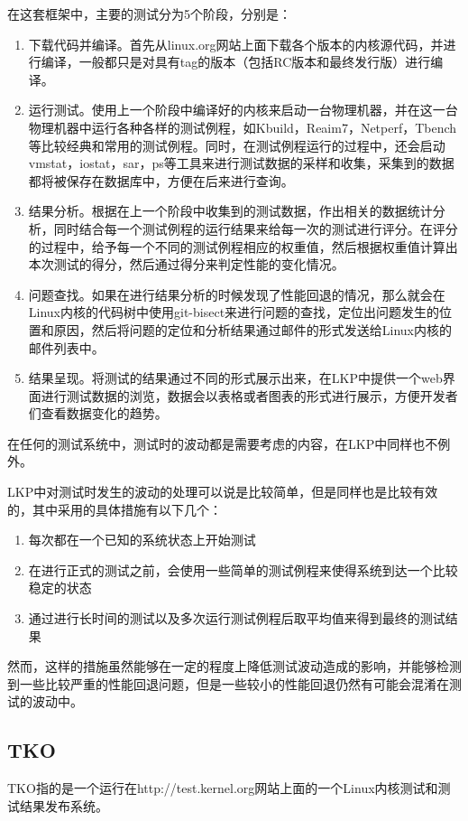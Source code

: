 在这套框架中，主要的测试分为5个阶段，分别是：
\begin{enumerate}
\item 下载代码并编译。首先从linux.org网站上面下载各个版本的内核源代码，并进行编译，一般都只是对具有tag的版本（包括RC版本和最终发行版）进行编译。
\item 运行测试。使用上一个阶段中编译好的内核来启动一台物理机器，并在这一台物理机器中运行各种各样的测试例程，如Kbuild，Reaim7，Netperf，Tbench等比较经典和常用的测试例程。同时，在测试例程运行的过程中，还会启动vmstat，iostat，sar，ps等工具来进行测试数据的采样和收集，采集到的数据都将被保存在数据库中，方便在后来进行查询。
\item 结果分析。根据在上一个阶段中收集到的测试数据，作出相关的数据统计分析，同时结合每一个测试例程的运行结果来给每一次的测试进行评分。在评分的过程中，给予每一个不同的测试例程相应的权重值，然后根据权重值计算出本次测试的得分，然后通过得分来判定性能的变化情况。
\item 问题查找。如果在进行结果分析的时候发现了性能回退的情况，那么就会在Linux内核的代码树中使用git-bisect来进行问题的查找，定位出问题发生的位置和原因，然后将问题的定位和分析结果通过邮件的形式发送给Linux内核的邮件列表中。
\item 结果呈现。将测试的结果通过不同的形式展示出来，在LKP中提供一个web界面进行测试数据的浏览，数据会以表格或者图表的形式进行展示，方便开发者们查看数据变化的趋势。
\end{enumerate}

在任何的测试系统中，测试时的波动都是需要考虑的内容，在LKP中同样也不例外。

LKP中对测试时发生的波动的处理可以说是比较简单，但是同样也是比较有效的，其中采用的具体措施有以下几个：
\begin{enumerate}
\item 每次都在一个已知的系统状态上开始测试
\item 在进行正式的测试之前，会使用一些简单的测试例程来使得系统到达一个比较稳定的状态
\item 通过进行长时间的测试以及多次运行测试例程后取平均值来得到最终的测试结果
\end{enumerate}

然而，这样的措施虽然能够在一定的程度上降低测试波动造成的影响，并能够检测到一些比较严重的性能回退问题，但是一些较小的性能回退仍然有可能会混淆在测试的波动中。


\subsection{TKO}
TKO指的是一个运行在http://test.kernel.org网站上面的一个Linux内核测试和测试结果发布系统。

